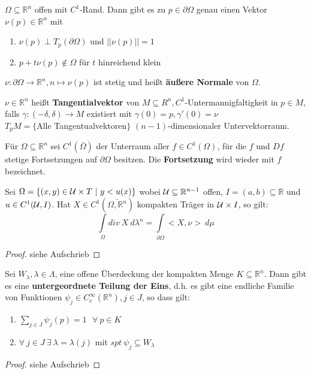 \begin{lemma}
  $\Omega \subseteq \mathbb{R}^n$ offen mit $C^1$-Rand. Dann gibt es zu $p \in \partial\Omega$ genau einen Vektor $\nu(p)\in \mathbb{R}^n$ mit
  \begin{enumerate}
    \item $\nu(p) \perp T_p(\partial \Omega)$ und $||\nu(p)|| = 1$
    \item $p + t \nu(p) \notin \Omega$ für $t$ hinreichend klein
  \end{enumerate}
  $\nu:\partial\Omega\to\mathbb{R}^n, n \mapsto \nu(p)$ ist stetig und heißt \textbf{äußere Normale} von $\Omega$.
\end{lemma}

\begin{remark}
  $\nu \in \mathbb{R}^n$ heißt \textbf{Tangentialvektor} von $M \subseteq R^n, C^1$-Untermannigfaltigkeit in $p\in M$, falls $\gamma:(-\delta, \delta) \to M$ existiert mit $\gamma(0) = p, \gamma'(0) = \nu$\\
  $T_pM = \{$Alle Tangentualvektoren$\}$ $(n-1)$-dimensionaler Untervektorraum.
\end{remark}

\begin{definition}
  Für $\Omega \subseteq \mathbb{R}^n$ sei $C^1(\bar{\Omega})$ der Unterraum aller $f\in C^1(\Omega)$, für die $f$ und $Df$ stetige Fortsetzungen auf $\partial \Omega$ besitzen. Die \textbf{Fortsetzung} wird wieder mit $f$ bezeichnet.
\end{definition}

\begin{lemma}
  Sei $\Omega = \{(x,y) \in \mathcal{U} \times T \ | \ y<u(x)\}$ wobei $\mathcal{U} \subseteq \mathbb{R}^{n-1}$ offen, $I = (a,b) \subseteq \mathbb{R}$ und $u \in C^1(\mathcal{U}, I)$. Hat $X \in C^1(\bar{\Omega, \mathbb{R}^n})$ kompakten Träger in $\mathcal{U}\times I$, so gilt:
  $$\int\limits_{\Omega} div \ X \ d\lambda^n = \int\limits_{\partial \Omega} <X, \nu> \ d\mu$$
\end{lemma}
\begin{proof}
  siehe Aufschrieb
\end{proof}

\begin{lemma}
  Sei $W_{\lambda}, \lambda \in \Lambda$, eine offene Überdeckung der kompakten Menge $K \subseteq \mathbb{R}^n$. Dann gibt es eine \textbf{untergeordnete Teilung der Eins}, d.h. es gibt eine endliche Familie von Funktionen $\psi_j \in C_c^{\infty}(\mathbb{R}^n), j \in J$, so dass gilt:
  \begin{enumerate}
    \item $\sum\limits_{j \in J} \psi_j(p) = 1 \ \ \ \forall \ p \in K$
    \item $\forall \ j \in J \ \exists \ \lambda = \lambda(j)$ mit $spt \ \psi_j \subseteq W_{\lambda}$
  \end{enumerate}
\end{lemma}
\begin{proof}
  siehe Aufschrieb
\end{proof}

